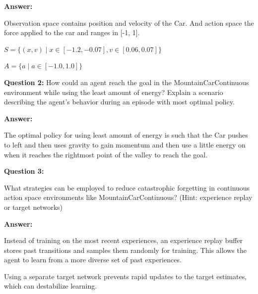 \documentclass[12pt]{article}
\begin{document}
{{{{\textbf{Answer:}

Observation space contains position and velocity of the Car. And action space the force applied to the car and ranges in [-1, 1].

$S = \{(x, v) \mid x \in [-1.2, -0.07], v \in [0.06, 0.07] \}$

$A=\{a \mid a \in [−1.0,1.0]\}$

\textbf{Question 2:}
How could an agent reach the goal in the MountainCarContinuous environment while using the least amount of energy? Explain a scenario describing the agent’s behavior during an episode with most optimal policy.

\textbf{Answer:}

The optimal policy for using least amount of energy is such that the Car pushes to left and then uses gravity to gain momentum and then use a little energy on when it reaches the rightmost point of the valley to reach the goal.

\textbf{Question 3:}

What strategies can be employed to reduce catastrophic forgetting in continuous action space environments like MountainCarContinuous? (Hint: experience replay or target networks)

\textbf{Answer:}

Instead of training on the most recent experiences, an experience replay buffer stores past transitions and samples them randomly for training. This allows the agent to learn from a more diverse set of past experiences.

Using a separate target network prevents rapid updates to the target estimates, which can destabilize learning.
}}




\newpage

{}}}
\end{document}
